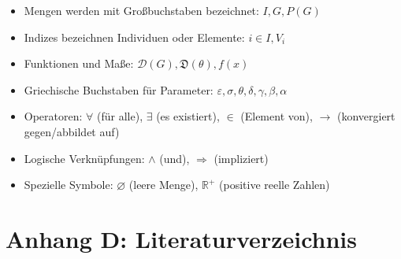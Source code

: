 \begin{itemize}
    \item Mengen werden mit Großbuchstaben bezeichnet: $I, G, P(G)$
    \item Indizes bezeichnen Individuen oder Elemente: $i \in I, V_i$
    \item Funktionen und Maße: $\mathcal{D}(G), \mathfrak{D}(\theta), f(x)$
    \item Griechische Buchstaben für Parameter: $\varepsilon, \sigma, \theta, \delta, \gamma, \beta, \alpha$
    \item Operatoren: $\forall$ (für alle), $\exists$ (es existiert), $\in$ (Element von), $\to$ (konvergiert gegen/abbildet auf)
    \item Logische Verknüpfungen: $\land$ (und), $\Rightarrow$ (impliziert)
    \item Spezielle Symbole: $\varnothing$ (leere Menge), $\mathbb{R}^+$ (positive reelle Zahlen)
\end{itemize}

\section*{Anhang D: Literaturverzeichnis}
\label{anhang:literatur}

